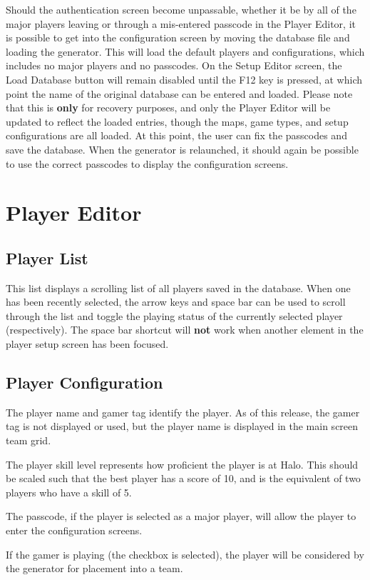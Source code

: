 \documentclass[pdftex,10pt,a4paper]{report}
\begin{document}
Should the authentication screen become unpassable, whether it be by all of the major players leaving or through a mis-entered passcode in the Player Editor, it is possible to get into the configuration screen by moving the database file and loading the generator.  This will load the default players and configurations, which includes no major players and no passcodes.  On the Setup Editor screen, the Load Database button will remain disabled until the F12 key is pressed, at which point the name of the original database can be entered and loaded.  Please note that this is \textbf{only} for recovery purposes, and only the Player Editor will be updated to reflect the loaded entries, though the maps, game types, and setup configurations are all loaded.  At this point, the user can fix the passcodes and save the database.  When the generator is relaunched, it should again be possible to use the correct passcodes to display the configuration screens.

\section{Player Editor}
\subsection{Player List}
This list displays a scrolling list of all players saved in the database.  When one has been recently selected, the arrow keys and space bar can be used to scroll through the list and toggle the playing status of the currently selected player (respectively).  The space bar shortcut will \textbf{not} work when another element in the player setup screen has been focused.

\subsection{Player Configuration}
The player name and gamer tag identify the player.  As of this release, the gamer tag is not displayed or used, but the player name is displayed in the main screen team grid.

The player skill level represents how proficient the player is at Halo.  This should be scaled such that the best player has a score of 10, and is the equivalent of two players who have a skill of 5.

The passcode, if the player is selected as a major player, will allow the player to enter the configuration screens.

If the gamer is playing (the checkbox is selected), the player will be considered by the generator for placement into a team.
\end{document}
